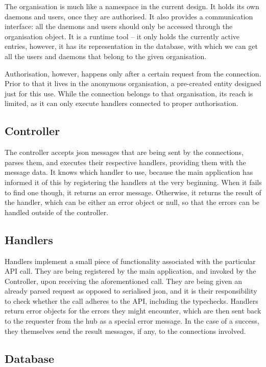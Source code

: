 \documentclass{l3proj}
\begin{document}
The organisation is much like a namespace in the current design. It holds its own daemons and users, once they are authorised. It also provides a communication interface: all the daemons and users should only be accessed through the organisation object. It is a runtime tool – it only holds the currently active entries, however, it has its representation in the database, with which we can get all the users and daemons that belong to the given organisation. 

Authorisation, however, happens only after a certain request from the connection. Prior to that it lives in the anonymous organisation, a pre-created entity designed just for this use. While the connection belongs to that organisation, its reach is limited, as it can only execute handlers connected to proper authorisation.

\subsection{Controller}

The controller accepts json messages that are being sent by the connections, parses them, and executes their respective handlers, providing them with the message data. It knows which handler to use, because the main application has informed it of this by registering the handlers at the very beginning. When it fails to find one though, it returns an error message. Otherwise, it returns the result of the handler, which can be either an error object or null, so that the errors can be handled outside of the controller.

\subsection{Handlers}

Handlers implement a small piece of functionality associated with the particular API call. They are being registered by the main application, and invoked by the Controller, upon receiving the aforementioned call. They are being given an already parsed request as opposed to serialised json, and it is their responsibility to check whether the call adheres to the API, including the typechecks. Handlers return error objects for the errors they might encounter, which are then sent back to the requester from the hub as a special error message. In the case of a success, they themselves send the result messages, if any, to the connections involved.

\subsection{Database}
\end{document}
